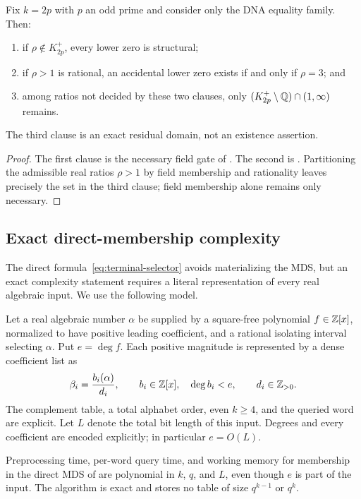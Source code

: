 \begin{corollary}
\label{cor:twice-prime-dna-trichotomy}
Fix $k=2p$ with $p$ an odd prime and consider only the DNA
 equality family.  Then:
\begin{enumerate}
  \item if $\rho\notin K_{2p}^+$, every lower zero is structural;
  \item if $\rho>1$ is rational, an accidental lower zero exists if and only
        if $\rho=3$; and
  \item among ratios not decided by these two clauses, only
        $(K_{2p}^+\setminus\mathbb Q)\cap(1,\infty)$ remains.
\end{enumerate}
The third clause is an exact residual domain, not an existence assertion.
\end{corollary}

\begin{proof}
The first clause is the necessary field gate of
.  The second is
.  Partitioning the admissible real ratios
$\rho>1$ by field membership and rationality leaves precisely the set in the
third clause; field membership alone remains only necessary.
\end{proof}

\subsection{Exact direct-membership complexity}
\label{sec:complexity}

The direct formula~\eqref{eq:terminal-selector} avoids materializing the MDS,
but an exact complexity statement requires a literal representation of every
real algebraic input.  We use the following model.

Let a real algebraic number $\alpha$ be supplied by a square-free polynomial
$f\in\mathbb Z[x]$, normalized to have positive leading coefficient, and a rational
isolating interval selecting $\alpha$.  Put $e=\deg f$.  Each positive
magnitude is represented by a dense coefficient list as
\[
  \beta_i=\frac{b_i(\alpha)}{d_i},\qquad
  b_i\in\mathbb Z[x],\quad \deg b_i<e,\qquad d_i\in\mathbb Z_{>0}.
\]
The complement table, a total alphabet order, even $k\ge4$, and the queried
word are explicit.  Let $L$ denote the total bit length of this input.
Degrees and every coefficient are encoded explicitly; in particular
$e=O(L)$.

\begin{theorem}
\label{thm:membership-complexity}
Preprocessing time, per-word query time, and working memory for membership in
the direct MDS of  are polynomial in $k$, $q$,
and $L$, even though $e$ is part of the input.  The algorithm is exact and
stores no table of size $q^{k-1}$ or $q^k$.
\end{theorem}

